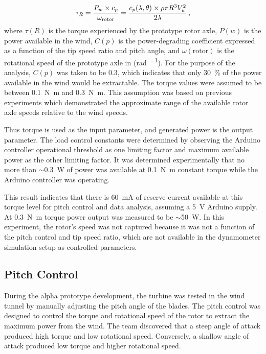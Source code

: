 \documentclass[11pt,letterpaper,conference]{IEEEtran}
\begin{document}
\begin{equation}
    \label{eq:torque}
    \tau_R = \frac{P_w \times c_p}{\omega_\text{rotor}}
    = \frac{c_p(\lambda, \theta) \times \rho \pi R^3 V_w^2}{2\lambda}
    \text{\,,}
\end{equation}
where $\tau(R)$ is the torque experienced by the prototype rotor axle,
$P(w)$ is the power available in the wind, $C(p)$ is the power-degrading
coefficient expressed as a function of the tip speed ratio and pitch angle,
and $\omega(\text{rotor})$ is the rotational speed of the prototype axle in
(\unit{\radian\per\sec}). For the purpose of the analysis, $C(p)$ was taken to
be \num{0.3}, which indicates that only \qty{30}{\percent} of the power
available in the wind would be extractable. The torque values were assumed to
be between \qty{.1}{\newton\m} and \qty{.3}{\newton\m}. This assumption was
based on previous experiments which demonstrated the approximate range of the
available rotor axle speeds relative to the wind speeds.

Thus torque is used as the input parameter, and generated power is the
output parameter. The load control constants were determined by observing the
Arduino controller operational threshold as one limiting factor and maximum
available power as the other limiting factor. It was determined experimentally
that no more than $\sim$\qty{0.3}{\W} of power was available at
\qty{.1}{\newton\m} constant torque while the Arduino controller was operating.

This result indicates that there is \qty{60}{\mA} of reserve current available
at this torque level for pitch control and data analysis, assuming a
\qty{5}{\V} Arduino supply. At \qty{.3}{\newton\m} torque power output was
measured to be $\sim$\qty{50}{\W}. In this experiment, the rotor's speed was
not captured because it was not a function of the pitch control and tip speed
ratio, which are not available in the dynamometer simulation setup as controlled
parameters.

\subsection{Pitch Control}

During the alpha prototype development, the turbine was tested in the wind
tunnel by manually adjusting the pitch angle of the blades. The pitch control
was designed to control the torque and rotational speed of the rotor to extract
the maximum power from the wind. The team discovered that a steep angle of
attack produced high torque and low rotational speed. Conversely, a shallow
angle of attack produced low torque and higher rotational speed.
\end{document}

